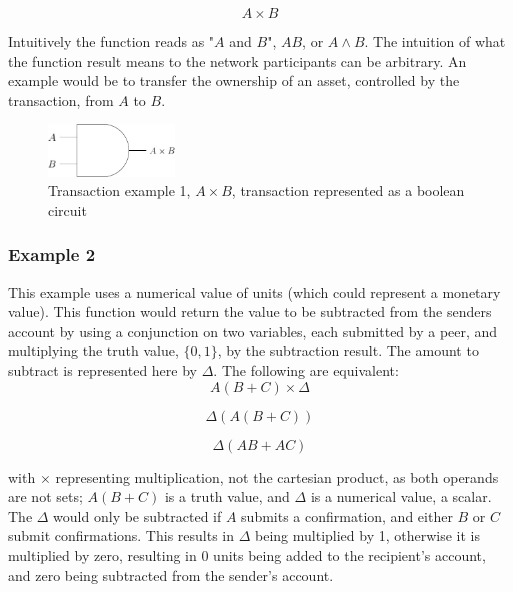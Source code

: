 \documentclass[10pt, titlepage, twocolumn]{report}
\begin{document}
\begin{equation}
A \times B
\end{equation}

\hspace*{15pt}
Intuitively the function reads as "\(A\) and \(B\)", \(AB\), or \(A \land B\). The intuition of what the function result means to the network participants can be arbitrary. An example would be to transfer the ownership of an asset, controlled by the transaction, from \(A\) to \(B\). 

\begin{figure}[ht]
\centering
	\includegraphics[width=0.3\textwidth]{txexample1}
	\caption{Transaction example 1, \(A \times B\),  transaction represented as a boolean circuit}
	\label{txexample1}
\end{figure}


\subsubsection{Example 2}
\hspace*{15pt}
This example uses a numerical value of units (which could represent a monetary value). This function would return the value to be subtracted from the senders account by using a conjunction on two variables, each submitted by a peer, and multiplying the truth value, \(\{0,1\}\), by the subtraction result. The amount to subtract is represented here by \(\Delta\). The following are equivalent:
\begin{equation}
A(B+C) \times \Delta
\end{equation}

\begin{equation}
\Delta(A(B+C))
\end{equation}

\begin{equation}
\Delta(AB+AC)
\end{equation}

\hspace*{15pt}
with \(\times\) representing multiplication, not the cartesian product, as both operands are not sets; \(A(B+C)\) is a truth value, and \(\Delta\) is a numerical value, a scalar. The \(\Delta\) would only be subtracted if \(A\) submits a confirmation, and either \(B\) or \(C\) submit confirmations. This results in \(\Delta\) being multiplied by 1, otherwise it is multiplied by zero, resulting in 0 units being added to the recipient's account, and zero being subtracted from the sender's account.
\end{document}
